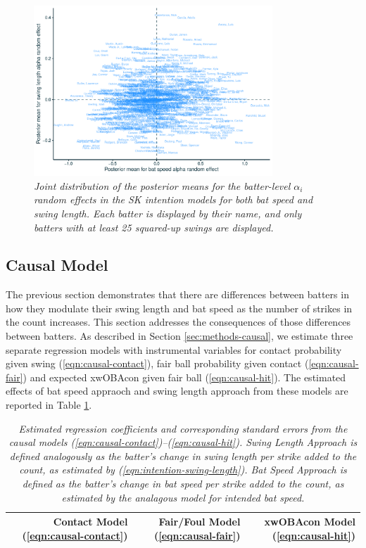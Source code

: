 \documentclass{article}
\begin{document}
      \begin{figure}[H]
        \centering
        \includegraphics[width = 0.8\textwidth]{../../figures/alpha_re.pdf}
        \caption{\it Joint distribution of the posterior means for the batter-level $\alpha_i$ random effects in the SK intention models for both bat speed and swing length. Each batter is displayed by their name, and only batters with at least 25 squared-up swings are displayed.}
        \label{fig:alpha-re}
      \end{figure}
      
    \subsection{Causal Model}
    \label{sec:results-causal}

      The previous section demonstrates that there are differences between batters in how they modulate their swing length and bat speed as the number of strikes in the count increases. This section addresses the consequences of those differences between batters. As described in Section \ref{sec:methods-causal}, we estimate three separate regression models with instrumental variables for contact probability given swing (\ref{eqn:causal-contact}), fair ball probability given contact (\ref{eqn:causal-fair}) and expected xwOBAcon given fair ball (\ref{eqn:causal-hit}). The estimated effects of bat speed appraoch and swing length approach from these models are reported in Table \ref{tab:causal-model}.

      \begin{table}[H]
        \centering
        \begin{tabular}{l|r|r|r|}
          & Contact Model (\ref{eqn:causal-contact}) & Fair/Foul Model (\ref{eqn:causal-fair}) & xwOBAcon Model (\ref{eqn:causal-hit})\\
          \hline
          
        \end{tabular}
        \caption{\it Estimated regression coefficients and corresponding standard errors from the causal models (\ref{eqn:causal-contact})--(\ref{eqn:causal-hit}). Swing Length Approach is defined analogously as the batter's change in swing length per strike added to the count, as estimated by (\ref{eqn:intention-swing-length}). Bat Speed Approach is defined as the batter's change in bat speed per strike added to the count, as estimated by the analagous model for intended bat speed.}
        \label{tab:causal-model}
      \end{table}
\end{document}
